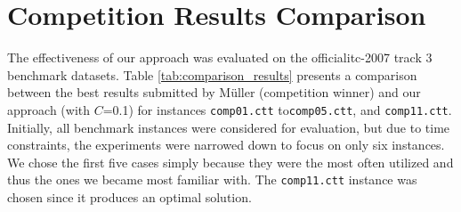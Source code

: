 \section{Competition Results Comparison}

The effectiveness of our approach was evaluated on the official\ac{itc-2007} track 3 benchmark datasets. Table \ref{tab:comparison_results} presents a comparison between the best results submitted by Müller (competition winner) and our approach (with \(C\)=0.1) for instances \texttt{comp01.ctt} to\texttt{comp05.ctt}, and \texttt{comp11.ctt}. Initially, all benchmark instances were considered for evaluation, but due to time constraints, the experiments were narrowed down to focus on only six instances. We chose the first five cases simply because they were the most often utilized and thus the ones we became most familiar with. The \texttt{comp11.ctt} instance was chosen since it produces an optimal solution.

